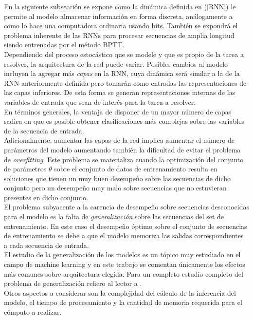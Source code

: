 \documentclass{article}
\begin{document}
	En la siguiente subsección se expone como la dinámica definida en (\ref{RNN}) le permite al modelo almacenar información en forma discreta, análogamente a como lo hace una computadora ordinaria usando bits. También se expondrá el problema inherente de las RNNs para procesar secuencias de amplia longitud siendo entrenadas por el método BPTT.\\
	
	Dependiendo del proceso estocástico que se modele y que es propio de la tarea a resolver, la arquitectura de la red puede variar. Posibles cambios al modelo incluyen la agregar más \textit{capas} en la RNN, cuya dinámica será similar a la de la RNN anteriormente definida pero tomarán como entradas las representaciones de las capas inferiores. De esta forma se generan representaciones internas de las variables de entrada\cite{5IntermediateFeatures} que sean de interés para la tarea a resolver.\\
	En términos generales, la ventaja de disponer de un mayor número de capas radica en que es posible obtener clasificaciones más complejas sobre las variables de la secuencia de entrada.\\ Adicionalmente, aumentar las capas de la red implica aumentar el número de parámetros del modelo aumentando también la dificultad de evitar el problema de \textit{overfitting}. Este problema se materializa cuando la optimización del conjunto de parámetros $\theta$ sobre el conjunto de datos de entrenamiento resulta en soluciones que tienen un muy buen desempeño sobre las secuencias de dicho conjunto pero un desempeño muy malo sobre secuencias que no estuvieran presentes en dicho conjunto.\\
	El problema subyacente a la carencia de desempeño sobre secuencias desconocidas para el modelo es la falta de \textit{generalización} sobre las secuencias del set de entrenamiento. En este caso el desempeño óptimo sobre el conjunto de secuencias de entrenamiento se debe a que el modelo memoriza las salidas correspondientes a cada secuencia de entrada.\\
	El estudio de la generalización de los modelos es un tópico muy estudiado en el campo de machine learning y en este trabajo se comentan únicamente los efectos más comunes sobre arquitectura elegida. Para un completo estudio completo del problema de generalización refiero al lector a \cite{6Generalization}.\\
	
	Otros aspectos a considerar son la complejidad del cálculo de la inferencia del modelo, el tiempo de procesamiento y la cantidad de memoria requerida para el cómputo a realizar.\\
	
\end{document}

